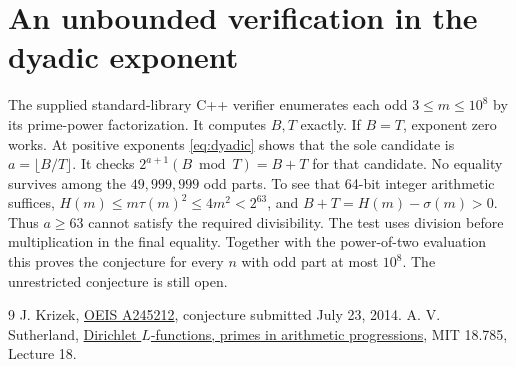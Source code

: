 \documentclass[11pt]{article}
\begin{document}
\section{An unbounded verification in the dyadic exponent}
The supplied standard-library C++ verifier enumerates each odd
$3\le m\le10^8$ by its prime-power factorization. It computes $B,T$
exactly. If $B=T$, exponent zero works. At positive exponents
\eqref{eq:dyadic} shows that the sole candidate is $a=\lfloor B/T\rfloor$.
It checks $2^{a+1}(B\bmod T)=B+T$ for that candidate. No equality
survives among the $49{,}999{,}999$ odd parts. To see that 64-bit
integer arithmetic suffices, $H(m)\le m\tau(m)^2\le4m^2<2^{63}$,
and $B+T=H(m)-\sigma(m)>0$. Thus $a\ge63$ cannot satisfy the
required divisibility. The test uses division before multiplication
in the final equality. Together with the power-of-two evaluation
this proves the conjecture for every $n$ with odd part at most
$10^8$. The unrestricted conjecture is still open.

\begin{thebibliography}{9}
 J. Krizek, \href{https://oeis.org/A245212}{OEIS A245212},
conjecture submitted July 23, 2014.
 A. V. Sutherland,
\href{https://math.mit.edu/classes/18.785/2021fa/LectureNotes18.pdf}{Dirichlet
$L$-functions, primes in arithmetic progressions}, MIT 18.785, Lecture 18.
\end{thebibliography}
\end{document}
